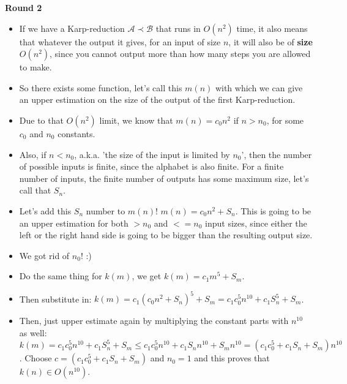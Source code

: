 \textbf{Round 2}

\begin{itemize}
    \item If we have a Karp-reduction $\mathcal{A} \prec \mathcal{B}$ that runs in $O(n^2)$ time, it also means that whatever the output it gives, for an input of size $n$, it will also be of \textbf{size} $O(n^2)$, since you cannot output more than how many steps you are allowed to make.
    \item So there exists some function, let's call this $m(n)$ with which we can give an upper estimation on the size of the output of the first Karp-reduction.
    \item Due to that $O(n^2)$ limit, we know that $m(n) = c_0n^2$ if $n>n_0$, for some $c_0$ and $n_0$ constants.
    \color{red}
    \item Also, if $n<n_0$, a.k.a. 'the size of the input is limited by $n_0$', then the number of possible inputs is finite, since the alphabet is also finite. For a finite number of inputs, the finite number of outputs has some maximum size, let's call that $S_n$.
    \item Let's add this $S_n$ number to $m(n)$! $m(n) = c_0n^2 + S_n$. This is going to be an upper estimation for both $>n_0$ and $<=n_0$ input sizes, since either the left or the right hand side is going to be bigger than the resulting output size.
    \item We got rid of $n_0$! :)
    \color{black}
    \item Do the same thing for $k(m)$, we get $k(m) = c_1m^5 + S_m$.
    \item Then substitute in: $k(m) = c_1(c_0n^2 + S_n)^5 + S_m = c_1c_0^5n^{10} + c_1S_n^5 + S_m$.
    \item Then, just upper estimate again by multiplying the constant parts with $n^10$ as well: $k(m) = c_1c_0^5n^{10} + c_1S_n^5 + S_m \leq{} c_1c_0^5n^{10} + c_1S_nn^{10} + S_mn^{10} = (c_1c_0^5 + c_1S_n+S_m)n^{10}$. Choose $c = (c_1c_0^5 + c_1S_n+S_m)$ and $n_0 = 1$ and this proves that $k(n) \in{} O(n^{10})$.
\end{itemize}